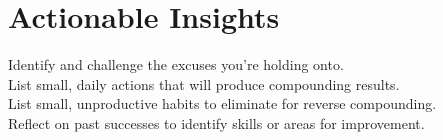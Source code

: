 \section*{Actionable Insights}
\begin{Form}
  \CheckBox[name=01]{} Identify and challenge the excuses you're holding onto.\\
  \CheckBox[name=02]{} List small, daily actions that will produce compounding results.\\
  \CheckBox[name=03]{} List small, unproductive habits to eliminate for reverse compounding.\\
  \CheckBox[name=04]{} Reflect on past successes to identify skills or areas for improvement.\\
\end{Form}
